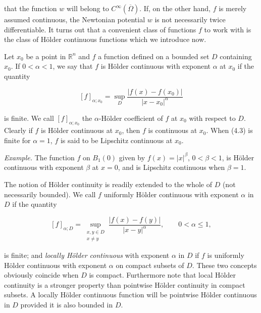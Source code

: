 
that the function $w$ will belong to $C^\infty(\overline{\Omega})$. If, on the other hand, $f$ is merely assumed continuous, the Newtonian potential $w$ is not necessarily twice differentiable. It turns out that a convenient class of functions $f$ to work with is the class of Hölder continuous functions which we introduce now.

\begin{definition}\label{gt:def-holder-pointwise}
Let $x_0$ be a point in $\mathbb{R}^n$ and $f$ a function defined on a bounded set $D$ containing $x_0$. If $0<\alpha<1$, we say that $f$ is Hölder continuous with exponent $\alpha$ at $x_0$ if the quantity

\[
\tag{4.3}
[f]_{\alpha;x_0}=\sup_D \frac{|f(x)-f(x_0)|}{|x-x_0|^\alpha}
\]

is finite. We call $[f]_{\alpha;x_0}$ the $\alpha$-Hölder coefficient of $f$ at $x_0$ with respect to $D$. Clearly if $f$ is Hölder continuous at $x_0$, then $f$ is continuous at $x_0$. When (4.3) is finite for $\alpha=1$, $f$ is said to be Lipschitz continuous at $x_0$.
\end{definition}

\emph{Example.} The function $f$ on $B_1(0)$ given by $f(x)=|x|^\beta$, $0<\beta<1$, is Hölder continuous with exponent $\beta$ at $x=0$, and is Lipschitz continuous when $\beta=1$.

\begin{definition}\label{gt:def-holder-uniform-local}
The notion of Hölder continuity is readily extended to the whole of $D$ (not necessarily bounded). We call $f$ uniformly Hölder continuous with exponent $\alpha$ in $D$ if the quantity

\[
\tag{4.4}
[f]_{\alpha;D}=\sup_{\substack{x,y\in D\\x\neq y}}\frac{|f(x)-f(y)|}{|x-y|^\alpha}, \qquad 0<\alpha\le 1,
\]

is finite; and \emph{locally Hölder continuous} with exponent $\alpha$ in $D$ if $f$ is uniformly Hölder continuous with exponent $\alpha$ on compact subsets of $D$. These two concepts obviously coincide when $D$ is compact. Furthermore note that local Hölder continuity is a stronger property than pointwise Hölder continuity in compact subsets. A locally Hölder continuous function will be pointwise Hölder continuous in $D$ provided it is also bounded in $D$.
\end{definition}

